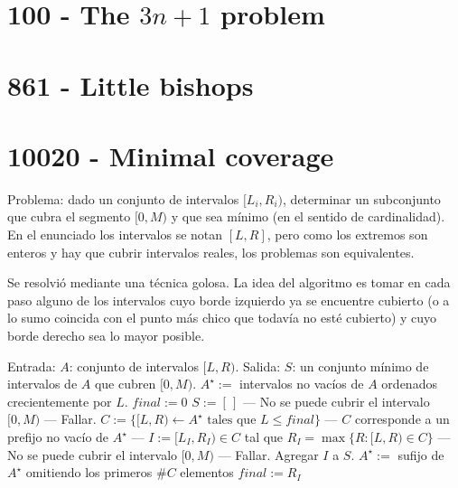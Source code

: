 \documentclass[10pt,a4paper,notitlepage]{article}
\begin{document}
\section{100 - The $3n + 1$ problem}

\section{861 - Little bishops}

\section{10020 - Minimal coverage}

Problema: dado un conjunto de intervalos $[L_i,R_i)$, determinar
un subconjunto que cubra el segmento $[0,M)$ y que sea m\'inimo
(en el sentido de cardinalidad). En el enunciado los intervalos
se notan $[L,R]$, pero como los extremos son enteros y hay que
cubrir intervalos reales, los problemas son equivalentes.

Se resolvi\'o mediante una t\'ecnica golosa. La idea del algoritmo
es tomar en cada paso alguno de los intervalos cuyo borde izquierdo
ya se encuentre cubierto (o a lo sumo coincida con el punto m\'as chico
que todav\'ia no est\'e cubierto) y cuyo borde derecho sea lo mayor posible.

\vspace{10pt}
\begin{algorithmic}
\STATE Entrada: $A$: conjunto de intervalos $[L,R)$.
\STATE Salida: $S$: un conjunto m\'inimo de intervalos de $A$ que cubren $[0,M)$.
\STATE $A^\star :=$ intervalos no vac\'ios de $A$ ordenados crecientemente por $L$.
\STATE $final := 0$
\STATE $S := [\,]$
  \IF {$A^\star$ es vac\'ia $\lor$ \big($A^\star_0 = [L,R)$ con $L > final$\big)}
    \STATE --- No se puede cubrir el intervalo $[0,M)$ ---
    \STATE Fallar.
  \ELSE
    \STATE $C := \{ [L,R) \gets A^\star \text{ tales que } L \leq final \}$
    \STATE --- $C$ corresponde a un prefijo no vac\'io de $A^\star$ ---
    \STATE $I := [L_I,R_I) \in C$ tal que $R_I = \max\{R : [L,R) \in C\}$
      \STATE --- No se puede cubrir el intervalo $[0,M)$ ---
      \STATE Fallar.
    \ENDIF
    \STATE Agregar $I$ a $S$.
    \STATE $A^\star := $ sufijo de $A^\star$ omitiendo los primeros $\#C$ elementos
    \STATE $final := R_I$
  \ENDIF
\ENDWHILE
\end{algorithmic}
\vspace{10pt}
\end{document}
